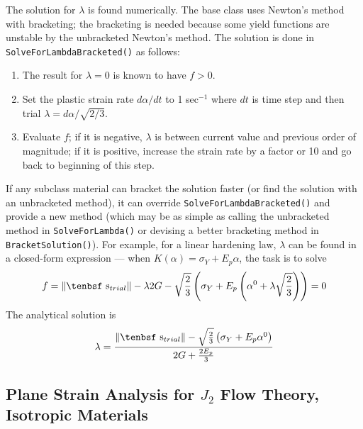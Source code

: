 \documentclass[11pt]{article}
\def\dev{\hbox{\tenbsf s}}
\begin{document}
The solution for $\lambda$ is found numerically. The base class uses Newton's method with bracketing; the bracketing is needed because some yield functions are unstable by the unbracketed Newton's method. The solution is done in {\tt SolveForLambdaBracketed()} as follows:

\begin{enumerate}

\item The result for $\lambda=0$ is known to have $f>0$.

\item Set the plastic strain rate $d\alpha/dt$ to 1 sec$^{-1}$ where $dt$ is time step and then trial $\lambda=d\alpha/\sqrt{2/3}$.

\item Evaluate $f$; if it is negative, $\lambda$ is between current value and previous order of magnitude; if it is positive, increase the strain rate by a factor or 10 and go back to beginning of this step.

\end{enumerate}

If any subclass material can bracket the solution faster (or find the solution with an unbracketed method), it can override {\tt SolveForLambdaBracketed()} and provide a new method (which may be as simple as calling the unbracketed method in {\tt SolveForLambda()} or devising a better bracketing method in {\tt BracketSolution()}). For example, for a linear hardening law, $\lambda$ can be found in a closed-form expression --- when $K(\alpha)=\sigma_Y + E_p\alpha$, the task is to solve
\begin{equation}
      f =  \|\dev_{trial}\| - \lambda 2G -  \sqrt{2\over3} \left(\sigma_Y + E_p\left(\alpha^{0}+ \lambda \sqrt{2\over3}\right)\right) = 0
\end{equation}
The analytical solution is
\begin{equation}
      \lambda = { \|\dev_{trial}\| - \sqrt{2\over3}\left(\sigma_Y + E_p\alpha^{0} \right) \over  2G +  {2E_p\over3} }
\end{equation}

\subsection{Plane Strain Analysis for $J_2$ Flow Theory, Isotropic Materials}
\end{document}
